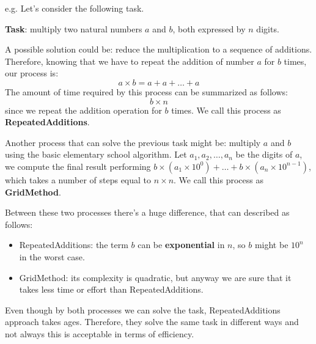 \begin{example}
e.g. Let's consider the following task. \vspace{7pt}

\textbf{Task}: multiply two natural numbers $a$ and $b$, both expressed by $n$ digits. \vspace{7pt}

A possible solution could be: reduce the multiplication to a sequence of additions. Therefore, knowing that we have to repeat the addition of number $a$ for $b$
times, our process is:
$$a \times b = a+a+ \dots + a$$
The amount of time required by this process can be summarized as follows:
$$b \times n$$
since we repeat the addition operation for $b$ times. We call this process as \textbf{RepeatedAdditions}. \vspace{7pt}

Another process that can solve the previous task might be: multiply $a$ and $b$ using the basic elementary school algorithm.
Let $a_1, a_2, \dots, a_n$ be the digits of $a$, we compute the final result performing $b \times (a_1 \times 10^0) + \dots + b \times (a_n \times 10^{n-1})$, which
takes a number of steps equal to $n \times n$. We call this process as \textbf{GridMethod}. \vspace{7pt}

Between these two processes there's a huge difference, that can described as follows:
\begin{itemize}
    \renewcommand{\labelitemi}{-}
    \item RepeatedAdditions: the term $b$ can be \textbf{exponential} in $n$, so $b$ might be $10^n$ in the worst case.
    \item GridMethod: its complexity is quadratic, but anyway we are sure that it takes less time or effort than RepeatedAdditions.
\end{itemize}

Even though by both processes we can solve the task, RepeatedAdditions approach takes ages. Therefore, they solve the same task in different ways and not 
always this is acceptable in terms of efficiency.
\end{example}